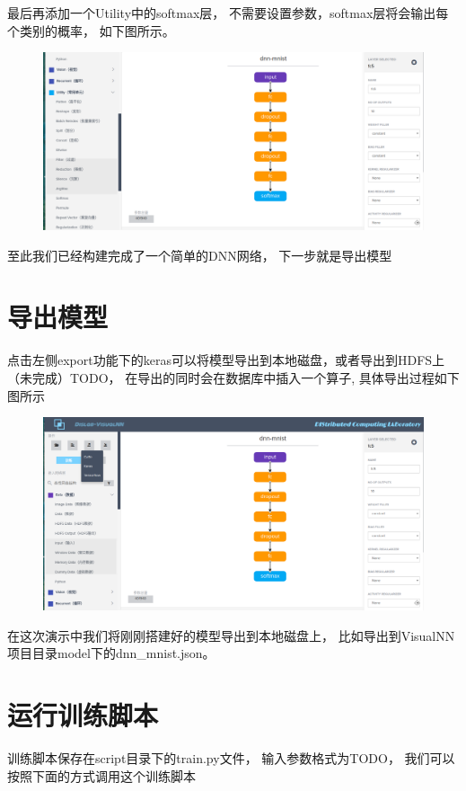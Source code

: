 \documentclass{progbookcn}
\begin{document}
最后再添加一个Utility中的softmax层， 不需要设置参数，softmax层将会输出每个类别的概率， 如下图所示。

\begin{figure}[H]
  \centering
  \includegraphics[width=0.98\linewidth]{example_softmax.png}
\end{figure}
至此我们已经构建完成了一个简单的DNN网络， 下一步就是导出模型

\section{导出模型}

点击左侧export功能下的keras可以将模型导出到本地磁盘，或者导出到HDFS上（未完成）TODO， 在导出的同时会在数据库中插入一个算子, 具体导出过程如下图所示
\begin{figure}[H]
  \centering
  \includegraphics[width=0.98\linewidth]{example_export.png}
\end{figure}

在这次演示中我们将刚刚搭建好的模型导出到本地磁盘上， 比如导出到VisualNN项目目录model下的dnn\_mnist.json。

\section{运行训练脚本}
训练脚本保存在script目录下的train.py文件， 输入参数格式为TODO， 我们可以按照下面的方式调用这个训练脚本
\end{document}
